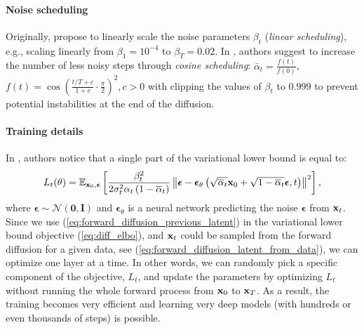 \paragraph{Noise scheduling} Originally, \cite{ho2020denoising} propose to linearly scale the noise parameters $\beta_t$ (\textit{linear scheduling}), e.g., scaling linearly from $\beta_1 = 10^{-4}$ to $\beta_{T} = 0.02$. In   \cite{nichol2021improved}, authors suggest to increase the number of less noisy steps through \textit{cosine scheduling}: %
$\bar{\alpha}_{t}=\frac{f(t)}{f(0)}$, $f(t)=\cos \left(\frac{t / T+c}{1+c} \cdot \frac{\pi}{2}\right)^{2}, c > 0$
with clipping the values of $\beta_t$ to $0.999$ to prevent potential instabilities at the end of the diffusion.

\paragraph{Training details} In \cite{ho2020denoising}, authors notice that a single part of the variational lower bound is equal to:
\begin{equation}\label{eq:l_t}
    L_{t}(\theta) = \mathbb{E}_{\rvx_{0}, \boldsymbol{\epsilon}}\left[\frac{\beta_{t}^{2}}{2 \sigma_{t}^{2} \alpha_{t}\left(1-\overline{\alpha}_{t}\right)}\left\|\boldsymbol{\epsilon}-\boldsymbol{\epsilon}_{\theta}\left(\sqrt{\overline{\alpha}_{t}} \rvx_{0}+\sqrt{1-\overline{\alpha}_{t}} \boldsymbol{\epsilon}, t\right)\right\|^{2}\right] ,
\end{equation}
where $\boldsymbol{\epsilon} \sim \mathcal{N}(\mathbf{0}, \mathbf{I})$ and $\boldsymbol{\epsilon}_\theta$ is a neural network predicting the noise $\boldsymbol{\epsilon}$ from ${\mathbf{x}}_t$.
Since we use (\ref{eq:forward_diffusion_previous_latent}) in the variational lower bound objective (\ref{eq:diff_elbo}), and ${\mathbf{x}}_t$ could be sampled from the forward diffusion for a given data, see (\ref{eq:forward_diffusion_latent_from_data}), we can optimize one layer at a time. In other words, we can randomly pick a specific component of the objective, $L_t$, and update the parameters by optimizing $L_t$ without running the whole forward process from ${\mathbf{x}}_0$ to ${\mathbf{x}}_T$. As a result, the training becomes very efficient and learning very deep models (with hundreds or even thousands of steps) is possible.

